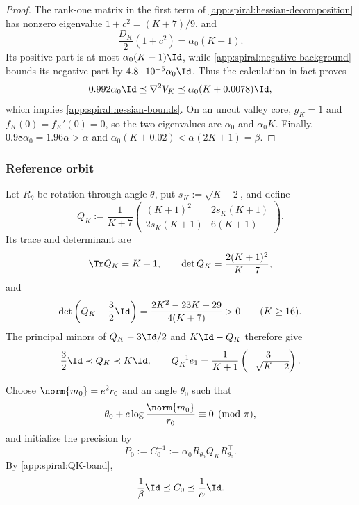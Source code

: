 \begin{proof}
The rank-one matrix in the first term of
\eqref{app:spiral:hessian-decomposition} has nonzero eigenvalue
\(1+c^2=(K+7)/9\), and
\[
    \frac{D_K}{2}(1+c^2)=\alpha_0(K-1).
\]
Its positive part is at most \(\alpha_0(K-1)\Id\), while
\eqref{app:spiral:negative-background} bounds its negative part by
\(4.8\cdot10^{-5}\alpha_0\Id\).  Thus the calculation in fact proves
\[
 0.992\alpha_0\Id\preceq\nabla^2V_K
 \preceq \alpha_0(K+0.0078)\Id,
\]
which implies \eqref{app:spiral:hessian-bounds}.  On an uncut valley core,
\(g_K=1\) and \(f_K(0)=f_K'(0)=0\), so the two eigenvalues are \(\alpha_0\) and
\(\alpha_0K\).  Finally, \(0.98\alpha_0=1.96\alpha>\alpha\) and
\(\alpha_0(K+0.02)<\alpha(2K+1)=\beta\).
\end{proof}

\subsubsection{Reference orbit}

Let \(R_\theta\) be rotation through angle \(\theta\), put
\(s_K:=\sqrt{K-2}\), and define
\begin{equation}
\label{app:spiral:QK}
    Q_K
    :=\frac1{K+7}
      \begin{pmatrix}
        (K+1)^2 & 2s_K(K+1)\\
        2s_K(K+1) & 6(K+1)
      \end{pmatrix}.
\end{equation}
Its trace and determinant are
\[
    \Tr Q_K=K+1,
    \qquad
    \det Q_K=\frac{2(K+1)^2}{K+7},
\]
and
\[
 \det\left(Q_K-\frac32\Id\right)
 =\frac{2K^2-23K+29}{4(K+7)}>0
 \qquad(K\geq16).
\]
The principal minors of \(Q_K-3\Id/2\) and \(K\Id-Q_K\) therefore give
\begin{equation}
\label{app:spiral:QK-band}
    \frac32\Id\prec Q_K\prec K\Id,
    \qquad
    Q_K^{-1}e_1
    =\frac1{K+1}\begin{pmatrix}3\\-\sqrt{K-2}\end{pmatrix}.
\end{equation}

Choose \(\norm{m_0}=e^2r_0\) and an angle \(\theta_0\) such that
\begin{equation}
\label{app:spiral:phase-initialization}
    \theta_0+c\log\frac{\norm{m_0}}{r_0}\equiv0\pmod\pi,
\end{equation}
and initialize the precision by
\begin{equation}
\label{app:spiral:precision-initialization}
    P_0:=C_0^{-1}
    :=\alpha_0R_{\theta_0}Q_KR_{\theta_0}^{\top}.
\end{equation}
By \eqref{app:spiral:QK-band},
\begin{equation}
\label{app:spiral:initial-covariance-band}
    \frac1\beta\Id\preceq C_0\preceq\frac1\alpha\Id.
\end{equation}

